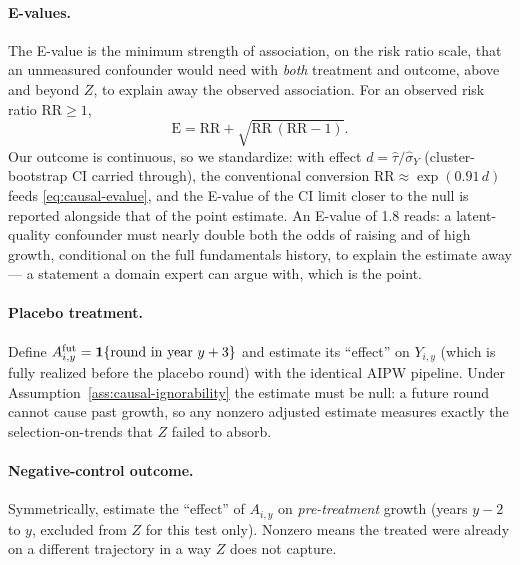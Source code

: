 \paragraph{E-values.}
The E-value \cite{vanderweele2017} is the minimum strength of association, on the risk
ratio scale, that an unmeasured confounder would need with \emph{both} treatment and
outcome, above and beyond $Z$, to explain away the observed association. For an
observed risk ratio $\mathrm{RR} \ge 1$,
\begin{equation}
\mathrm{E} = \mathrm{RR} + \sqrt{\mathrm{RR}\,(\mathrm{RR} - 1)} .
\label{eq:causal-evalue}
\end{equation}
Our outcome is continuous, so we standardize: with effect $d = \hat\tau / \hat\sigma_Y$
(cluster-bootstrap CI carried through), the conventional conversion
$\mathrm{RR} \approx \exp(0.91\, d)$ feeds \eqref{eq:causal-evalue}, and the E-value of
the CI limit closer to the null is reported alongside that of the point estimate. An
E-value of 1.8 reads: a latent-quality confounder must nearly double both the odds of
raising and of high growth, conditional on the full fundamentals history, to explain
the estimate away --- a statement a domain expert can argue with, which is the point.

\paragraph{Placebo treatment.}
Define $A^{\mathrm{fut}}_{i,y} = \mathbf{1}\{\text{round in year } y + 3\}$ and estimate its
``effect'' on $Y_{i,y}$ (which is fully realized before the placebo round) with the
identical AIPW pipeline. Under Assumption~\ref{ass:causal-ignorability} the estimate
must be null: a future round cannot cause past growth, so any nonzero adjusted estimate
measures exactly the selection-on-trends that $Z$ failed to absorb.

\paragraph{Negative-control outcome.}
Symmetrically, estimate the ``effect'' of $A_{i,y}$ on \emph{pre-treatment} growth
(years $y-2$ to $y$, excluded from $Z$ for this test only). Nonzero means the treated
were already on a different trajectory in a way $Z$ does not capture.

